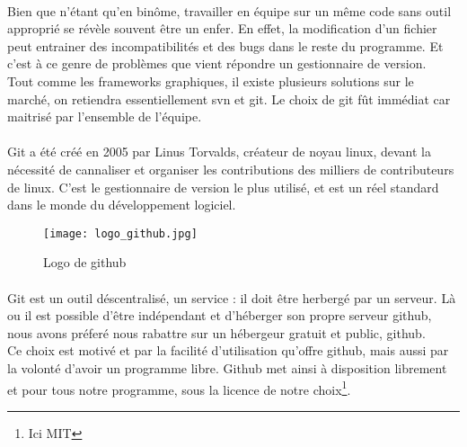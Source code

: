         \paragraph{}
            Bien que n'étant qu'en binôme, travailler en équipe sur un même code sans outil approprié se révèle souvent être un enfer. En effet, la modification d'un fichier peut entrainer des incompatibilités et des bugs dans le reste du programme. Et c'est à ce genre de problèmes que vient répondre un gestionnaire de version.
            \\ Tout comme les frameworks graphiques, il existe plusieurs solutions sur le marché, on retiendra essentiellement svn et git. Le choix de git fût immédiat car maitrisé par l'ensemble de l'équipe. 

        \paragraph{}
            Git a été créé en 2005 par Linus Torvalds, créateur de noyau linux, devant la nécessité de cannaliser et organiser les contributions des milliers de contributeurs de linux. C'est le gestionnaire de version le plus utilisé, et est un réel standard dans le monde du développement logiciel.

        \begin{figure}[h]
            \begin{center}
                \texttt{[image: logo\_github.jpg]}
            \end{center}

            \caption{Logo de github}
            \label{github}
        \end{figure}

        \paragraph{}
            Git est un outil déscentralisé, un service : il doit être herbergé par un serveur. Là ou il est possible d'être indépendant et d'héberger son propre serveur github, nous avons préferé nous rabattre sur un hébergeur gratuit et public, github.
            \\ Ce choix est motivé et par la facilité d'utilisation qu'offre github, mais aussi par la volonté d'avoir un programme libre. Github met ainsi à 
            disposition librement et pour tous notre programme, sous la licence de notre choix\footnote{Ici MIT}.
            



